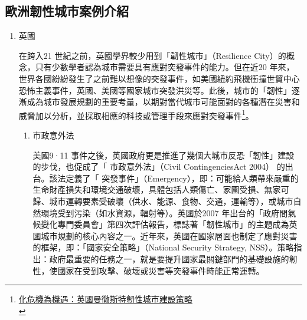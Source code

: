 \documentclass[a4paper,12pt]{article}
\begin{document}
\subsection{歐洲韌性城市案例介紹}
\label{sec:org2bbb7ee}
\begin{enumerate}
\item 英國
\label{sec:orgdfaebe1}

在跨入21 世紀之前，英國學界較少用到「韌性城市」（Resilience City）的概念，只有少數學者認為城市需要具有應對突發事件的能力。但在近20 年來，世界各國紛紛發生了之前難以想像的突發事件，如美國紐約飛機衝撞世貿中心恐怖主義事件，英國、美國等國家城市突發洪災等。此後，城市的「韌性」逐漸成為城市發展規劃的重要考量，以期對當代城市可能面對的各種潛在災害和威脅加以分析，並採取相應的科技或管理手段來應對突發事件\footnote{\href{https://kknews.cc/zh-tw/world/jkga9bl.html}{化危機為機遇：英國曼徹斯特韌性城市建設策略}\\\label{orgda387bf}}。\\

\begin{enumerate}
\item 市政意外法
\label{sec:orgc66b3c5}

美國9·11 事件之後，英國政府更是推進了幾個大城市反恐「韌性」建設的步伐，也促成了「 市政意外法」（Civil ContingenciesAct 2004） 的出台。該法定義了「 突發事件」（Emergency），即：可能給人類帶來嚴重的生命財產損失和環境交通破壞，具體包括人類傷亡、家園受損、無家可歸、城市運轉要素受破壞（供水、能源、食物、交通，運輸等），或城市自然環境受到污染（如水資源，輻射等）。英國於2007 年出台的「政府間氣候變化專門委員會」第四次評估報告，標誌著「韌性城市」的主題成為英國城市規劃的核心內容之一。近年來，英國在國家層面也制定了應對災害的框架，即：「國家安全策略」（National Security Strategy, NSS）。策略指出：政府最重要的任務之一，就是要提升國家最關鍵部門的基礎設施的韌性，使國家在受到攻擊、破壞或災害等突發事件時能正常運轉。\\


\end{enumerate}
\end{enumerate}
\end{document}
